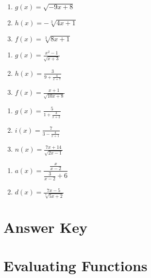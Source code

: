 \begin{multicols}{3}
\begin{enumerate}	\setcounter{enumi}{\value{Review}}
	\item $g(x) = \sqrt{-9x+8}$
	\item $h(x) = -\sqrt[3]{4x+1}$
	\item $f(x) = \sqrt[3]{8x+1}$
\end{enumerate}	\setcounter{Review}{\value{enumi}}
\end{multicols}
\begin{multicols}{3}
\begin{enumerate}	\setcounter{enumi}{\value{Review}}
	\item $g(x) = \frac{x^2-1}{\sqrt{x+3}}$
	\item $h(x) = \frac{3}{9 + \frac{4}{x+7}}$
	\item $f(x) = \frac{x+1}{\sqrt{10x+8}}$
\end{enumerate}	\setcounter{Review}{\value{enumi}}
\end{multicols}
\begin{multicols}{3}
\begin{enumerate}	\setcounter{enumi}{\value{Review}}
	\item $g(x) = \frac{5}{1+\frac{3}{x+2}}$
	\item $i(x) = \frac{7}{3-\frac{4}{x+1}}$
	\item $n(x) = \frac{7x+14}{\sqrt{2x-1}}$
\end{enumerate}	\setcounter{Review}{\value{enumi}}
\end{multicols}
\begin{multicols}{3}
\begin{enumerate}	\setcounter{enumi}{\value{Review}}
	\item $a(x) = \dfrac{\frac{x}{x-2}}{{\frac{3}{x-2}+6}}$
	\item $d(x) = \frac{7x-5}{\sqrt[3]{5x+2}}$
\end{enumerate}
\end{multicols}



\newpage

\section{Answer Key}

\section*{Evaluating Functions}

